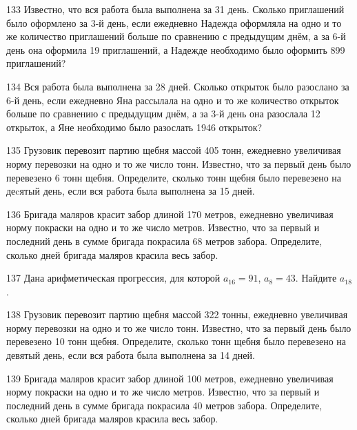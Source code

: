 \documentclass[4apaper]{article}
\begin{document}
\begin{taskBN}{133}
Известно, что вся работа была выполнена за 31 день. Сколько приглашений было оформлено за 3-й день, если ежедневно Надежда оформляла на одно и то же количество приглашений больше по сравнению с предыдущим днём, а за 6-й день она оформила 19 приглашений, а Надежде необходимо было оформить 899 приглашений? 
\end{taskBN}

\begin{taskBN}{134}
Вся работа была выполнена за 28 дней. Сколько открыток было разослано за 6-й день, если ежедневно Яна рассылала на одно и то же количество открыток больше по сравнению с предыдущим днём, а за 3-й день она разослала 12 открыток, а Яне необходимо было разослать 1946 открыток? 
\end{taskBN}

\begin{taskBN}{135}
Грузовик перевозит партию щебня массой 405 тонн, ежедневно увеличивая норму перевозки на одно и то же число тонн. Известно, что за первый день было перевезено 6 тонн щебня. Определите, сколько тонн щебня было перевезено на деcятый день, если вся работа была выполнена за 15 дней.
\end{taskBN}

\begin{taskBN}{136}
 Бригада маляров красит забор длиной 170 метров, ежедневно увеличивая норму покраски на одно и то же число метров. Известно, что за первый и последний день в сумме бригада покрасила 68 метров забора.  Определите, сколько дней бригада маляров красила весь забор. 
\end{taskBN}

\begin{taskBN}{137}
Дана арифметическая прогрессия, для которой $a_{16} = 91$, $a_{8} = 43$. Найдите $a_{18}$.
\end{taskBN}

\begin{taskBN}{138}
Грузовик перевозит партию щебня массой 322 тонны, ежедневно увеличивая норму перевозки на одно и то же число тонн. Известно, что за первый день было перевезено 10 тонн щебня. Определите, сколько тонн щебня было перевезено на девятый день, если вся работа была выполнена за 14 дней.
\end{taskBN}

\begin{taskBN}{139}
 Бригада маляров красит забор длиной 100 метров, ежедневно увеличивая норму покраски на одно и то же число метров. Известно, что за первый и последний день в сумме бригада покрасила 40 метров забора.  Определите, сколько дней бригада маляров красила весь забор. 
\end{taskBN}
\end{document}
